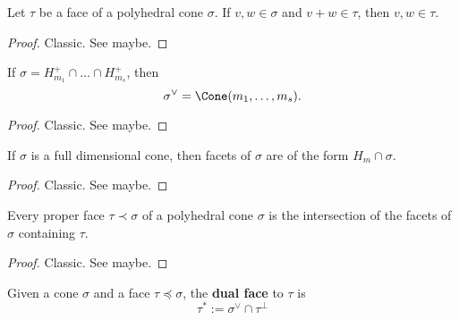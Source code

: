 \begin{lemma}
  \label{1-2-7-face-mem-of-add}

  Let $\tau$ be a face of a polyhedral cone $\sigma$. If $v, w \in \sigma$ and $v + w \in \tau$, then $v, w \in \tau$.
\end{lemma}
\begin{proof}
  \uses{}

  Classic. See \cite{Oda_1988} maybe.
\end{proof}


\begin{proposition}
  \label{1-2-8-dual-cone-inter-halfspaces}

  If $\sigma = H_{m_1}^+ \cap \dots \cap H_{m_s}^+$, then
  $$\sigma^\vee = \Cone(m_1, \dots, m_s).$$
\end{proposition}
\begin{proof}
  \uses{}

  Classic. See \cite{Oda_1988} maybe.
\end{proof}


\begin{proposition}
  \label{1-2-8-facet-full-dim-cone}

  If $\sigma$ is a full dimensional cone, then facets of $\sigma$ are of the form $H_m \cap \sigma$.
\end{proposition}
\begin{proof}
  \uses{}

  Classic. See \cite{Oda_1988} maybe.
\end{proof}


\begin{proposition}
  \label{1-2-8-inter-facet}

  Every proper face $\tau \prec \sigma$ of a polyhedral cone $\sigma$ is the intersection of the facets of $\sigma$ containing $\tau$.
\end{proposition}
\begin{proof}
  \uses{}

  Classic. See \cite{Oda_1988} maybe.
\end{proof}


\begin{definition}
  \label{1-2-10-dual-face}

  Given a cone $\sigma$ and a face $\tau \preceq \sigma$, the {\bf dual face} to $\tau$ is
  $$\tau^* := \sigma^\vee \cap \tau^\perp$$
\end{definition}


